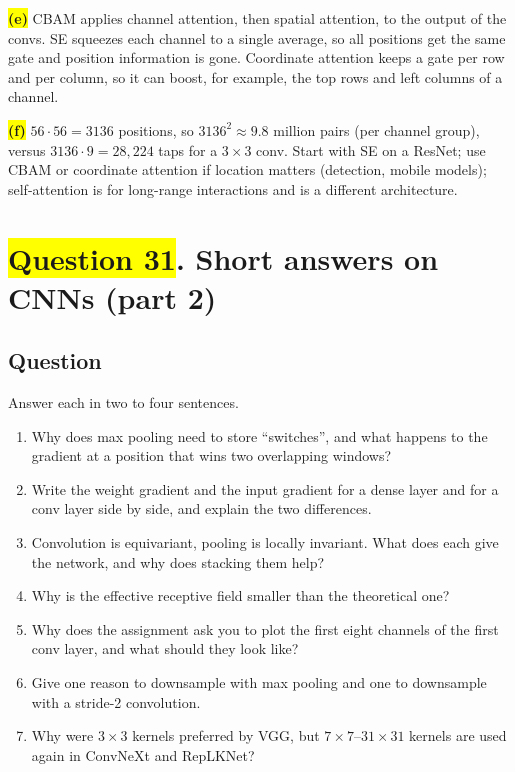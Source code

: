 \documentclass[12pt,a4paper]{article}
\newcommand{\hlq}[1]{{\setlength{\fboxsep}{1.5pt}\colorbox{yellow}{#1}}}
\begin{document}
\hlq{\textbf{(e)}} CBAM applies channel attention, then spatial attention, to the output of the convs. SE squeezes each channel to a single average, so all positions get the same gate and position information is gone. Coordinate attention keeps a gate per row and per column, so it can boost, for example, the top rows and left columns of a channel.

\hlq{\textbf{(f)}} $56\cdot56=3136$ positions, so $3136^2\approx9.8$ million pairs (per channel group), versus $3136\cdot9=28{,}224$ taps for a $3\times3$ conv. Start with SE on a ResNet; use CBAM or coordinate attention if location matters (detection, mobile models); self-attention is for long-range interactions and is a different architecture.

\section[Question 31. Short answers on CNNs (part 2)]{\hlq{Question 31}. Short answers on CNNs (part 2)}
\subsection*{Question}
Answer each in two to four sentences.
\begin{enumerate}[label=(\alph*)]
\item[\hlq{(a)}] Why does max pooling need to store ``switches'', and what happens to the gradient at a position that wins two overlapping windows?
\item[\hlq{(b)}] Write the weight gradient and the input gradient for a dense layer and for a conv layer side by side, and explain the two differences.
\item[\hlq{(c)}] Convolution is equivariant, pooling is locally invariant. What does each give the network, and why does stacking them help?
\item[(d)] Why is the effective receptive field smaller than the theoretical one?
\item[\hlq{(e)}] Why does the assignment ask you to plot the first eight channels of the first conv layer, and what should they look like?
\item[\hlq{(f)}] Give one reason to downsample with max pooling and one to downsample with a stride-2 convolution.
\item[(g)] Why were $3\times3$ kernels preferred by VGG, but $7\times7$--$31\times31$ kernels are used again in ConvNeXt and RepLKNet?
\end{enumerate}
\end{document}
